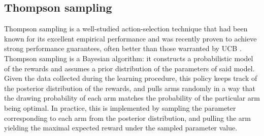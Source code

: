 \documentclass[10pt,journal,compsoc]{IEEEtran}
\begin{document}
	\subsection{Thompson sampling}
	\label{section:bandits_thompsons}	
	Thompson sampling \cite{thompson1933likelihood} is a well-studied action-selection technique that had been known for its excellent empirical performance \cite{CL11} and was recently proven to achieve strong performance guarantees, often better than those warranted by UCB \cite{AG12,KKM12,KKM13}. Thompson sampling is a Bayesian algorithm: it constructs a probabilistic model of the rewards and assumes a prior distribution of the parameters of said model. Given the data collected during the learning procedure, this policy keeps track of the posterior distribution of the rewards, and pulls arms randomly in a way that the drawing probability of each arm matches the probability of the particular arm being optimal. In practice, this is implemented by sampling the parameter corresponding to each arm from the posterior distribution, and pulling the arm yielding the maximal expected reward under the sampled parameter value.
	
\end{document}
